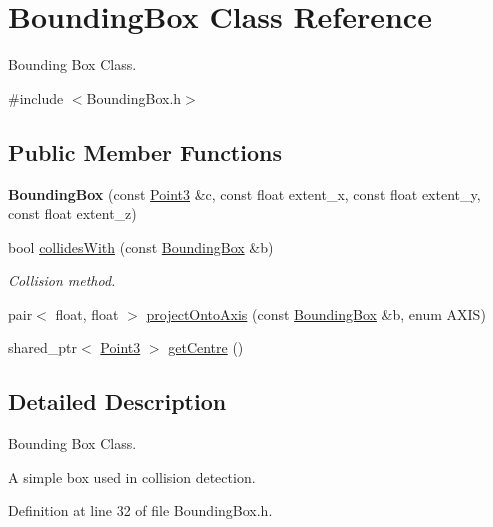 \hypertarget{classBoundingBox}{\section{Bounding\-Box Class Reference}
\label{classBoundingBox}
}


Bounding Box Class.  




{\ttfamily \#include $<$Bounding\-Box.\-h$>$}

\subsection*{Public Member Functions}
\begin{DoxyCompactItemize}
\item 
\hypertarget{classBoundingBox_af06000fc84c707ac6fc5451c63de3480}{{\bfseries Bounding\-Box} (const \hyperlink{classVectormath_1_1Aos_1_1Point3}{Point3} \&c, const float extent\-\_\-x, const float extent\-\_\-y, const float extent\-\_\-z)}\label{classBoundingBox_af06000fc84c707ac6fc5451c63de3480}

\item 
bool \hyperlink{classBoundingBox_a90418b763701826c706178845903dd7c}{collides\-With} (const \hyperlink{classBoundingBox}{Bounding\-Box} \&b)
\begin{DoxyCompactList}\small\item\em Collision method. \end{DoxyCompactList}\item 
pair$<$ float, float $>$ \hyperlink{classBoundingBox_a20a8d578fbfd1702e183921f9ec0a0d2}{project\-Onto\-Axis} (const \hyperlink{classBoundingBox}{Bounding\-Box} \&b, enum A\-X\-I\-S)
\item 
shared\-\_\-ptr$<$ \hyperlink{classVectormath_1_1Aos_1_1Point3}{Point3} $>$ \hyperlink{classBoundingBox_aceef7769498825680d34638bccc6f490}{get\-Centre} ()
\end{DoxyCompactItemize}


\subsection{Detailed Description}
Bounding Box Class. 

A simple box used in collision detection. 

Definition at line 32 of file Bounding\-Box.\-h.



